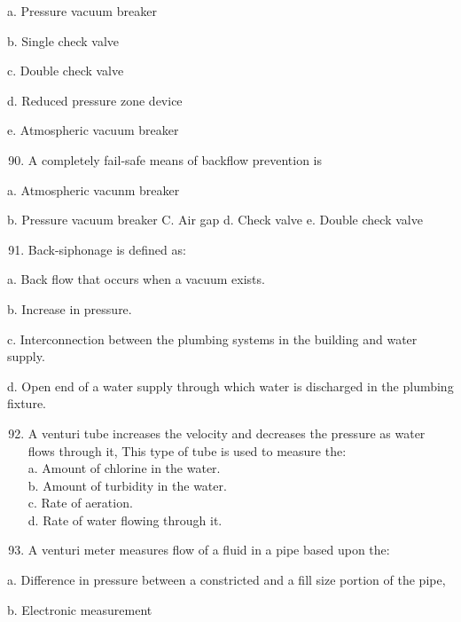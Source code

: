 \documentclass[10pt]{article}
\begin{document}
\begin{enumerate}
\begin{enumerate}
\begin{enumerate}
\end{enumerate}

a. Pressure vacuum breaker

b. Single check valve

c. Double check valve

d. Reduced pressure zone device

e. Atmospheric vacuum breaker

\begin{enumerate}
  \setcounter{enumi}{89}
  \item A completely fail-safe means of backflow prevention is
\end{enumerate}

a. Atmospheric vacunm breaker

b. Pressure vacuum breaker
C. Air gap
d. Check valve
e. Double check valve

\begin{enumerate}
  \setcounter{enumi}{90}
  \item Back-siphonage is defined as:
\end{enumerate}

a. Back flow that occurs when a vacuum exists.

b. Increase in pressure.

c. Interconnection between the plumbing systems in the building and water supply.

d. Open end of a water supply through which water is discharged in the plumbing fixture.

\begin{enumerate}
  \setcounter{enumi}{91}
  \item A venturi tube increases the velocity and decreases the pressure as water flows through it, This type of tube is used to measure the:\\
a. Amount of chlorine in the water.\\
b. Amount of turbidity in the water.\\
c. Rate of aeration.\\
d. Rate of water flowing through it.\\

  \item A venturi meter measures flow of a fluid in a pipe based upon the:

\end{enumerate}

a. Difference in pressure between a constricted and a fill size portion of the pipe,

b. Electronic measurement


\end{enumerate}
\end{enumerate}
\end{document}
